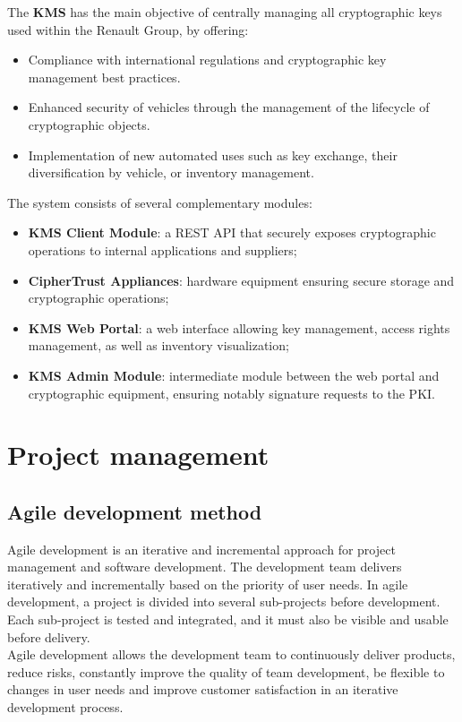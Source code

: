 \noindent
The \textbf{KMS} has the main objective of centrally managing all cryptographic keys used within the Renault Group, by offering:
\begin{itemize}
    \item Compliance with international regulations and cryptographic key management best practices.
    \item Enhanced security of vehicles through the management of the lifecycle of cryptographic objects.
    \item Implementation of new automated uses such as key exchange, their diversification by vehicle, or inventory management.
\end{itemize}

\noindent
The system consists of several complementary modules:
\begin{itemize}
    \item \textbf{KMS Client Module}: a REST API that securely exposes cryptographic operations to internal applications and suppliers;
    \item \textbf{CipherTrust Appliances}: hardware equipment ensuring secure storage and cryptographic operations;
    \item \textbf{KMS Web Portal}: a web interface allowing key management, access rights management, as well as inventory visualization;
    \item \textbf{KMS Admin Module}: intermediate module between the web portal and cryptographic equipment, ensuring notably signature requests to the PKI.
\end{itemize}

\newpage
\section{Project management}

\subsection{Agile development method}
Agile development is an iterative and incremental approach for project management and software development. The development team delivers iteratively and incrementally based on the priority of user needs. In agile development, a project is divided into several sub-projects before development. Each sub-project is tested and integrated, and it must also be visible and usable before delivery.\\

\noindent
Agile development allows the development team to continuously deliver products, reduce risks, constantly improve the quality of team development, be flexible to changes in user needs and improve customer satisfaction in an iterative development process.

